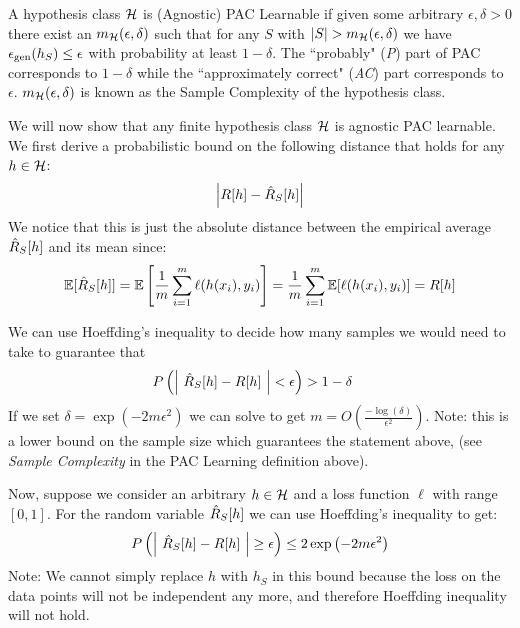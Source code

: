 \documentclass{article}
\begin{document}
\begin{defn}
A hypothesis class $\mathcal{H}$ is (Agnostic) PAC Learnable if given some arbitrary $\epsilon, \delta > 0$ there exist an $m_{\mathcal{H}} (\epsilon,\delta)$ such that for any $S$ with $|S| > m_{\mathcal{H}} (\epsilon,\delta)$ we have $\epsilon_{\text{gen}}(h_S) \le \epsilon$ with probability at least $1 - \delta$. The ``probably" (\emph{P}) part of PAC corresponds to $1 - \delta$ while the ``approximately correct" (\emph{AC}) part corresponds to $\epsilon$. $m_{\mathcal{H}} (\epsilon,\delta)$ is known as the Sample Complexity of the hypothesis class.
\end{defn}

We will now show that any finite hypothesis class $\mathcal{H}$ is agnostic PAC learnable. We first derive a probabilistic bound on the following distance that holds for any $h \in \mathcal{H}$:
$$\left|R[h] - \hat{R}_S[h]\right|$$
We notice that this is just the absolute distance between the empirical average $\hat{R}_S[h]$ and its mean since:
\begin{align*}
     \mathbb{E}[\hat{R}_S[h]] = \mathbb{E}\left[\frac{1}{m} \sum_{i = 1}^m \ell(h(x_i), y_i)\right] = \frac{1}{m} \sum_{i = 1}^m \mathbb{E}[\ell(h(x_i), y_i)] = R[h]
\end{align*}


We can use Hoeffding's inequality to decide how many samples we would need to take to guarantee that  
\begin{align*}
    &P\left(\left| \ \hat{R}_S[h] - R[h] \ \right| < \epsilon\right) > 1-\delta
\end{align*}
If we set $\delta = \exp\left(-2 m \epsilon^2\right)$ we can solve to get $m = O\left(\frac{-\log(\delta)}{\epsilon^2}\right)$. Note: this is a lower bound on the sample size which guarantees the statement above, (see \emph{Sample Complexity} in the PAC Learning definition above).

Now, suppose we consider an arbitrary $h\in\mathcal{H}$ and a loss function $\ell$ with range $[0,1]$. For the random variable $\hat{R}_S[h]$ we can use Hoeffding's inequality to get:
\begin{align*}
    P\left( \left| \ \hat{R}_S[h] - R[h] \ \right| \ge \epsilon\right) \le 2 \exp\left(-2 m \epsilon^2\right)
\end{align*}
Note: We cannot simply replace $h$ with $h_S$ in this bound because the loss on the data points will not be independent any more, and therefore Hoeffding inequality will not hold.
\end{document}
